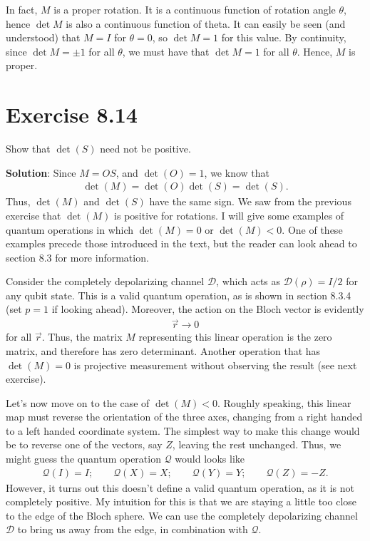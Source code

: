 \documentclass{book}
\begin{document}
    In fact, $M$ is a proper rotation. It is a continuous function of rotation angle $\theta$, hence $\det M$ is also a continuous function of theta. It can easily be seen (and understood) that $M = I$ for $\theta = 0$, so $\det M = 1$ for this value. By continuity, since $\det M = \pm 1$ for all $\theta$, we must have that $\det M = 1$ for all $\theta$. Hence, $M$ is proper. 
    
\section*{Exercise 8.14}
    Show that $\det(S)$ need not be positive.

    \textbf{Solution}: Since $M = O S$, and $\det(O) = 1$, we know that
    \begin{align}
        \det(M) = \det(O) \det(S) = \det(S).
    \end{align}
    Thus, $\det(M)$ and $\det(S)$ have the same sign. We saw from the previous exercise that $\det(M)$ is positive for rotations. I will give some examples of quantum operations in which $\det(M) = 0$ or $\det(M) < 0$. One of these examples precede those introduced in the text, but the reader can look ahead to section 8.3 for more information. 

    Consider the completely depolarizing channel $\mathcal{D}$, which acts as $\mathcal{D}(\rho) = I/2$ for any qubit state. This is a valid quantum operation, as is shown in section 8.3.4 (set $p = 1$ if looking ahead). Moreover, the action on the Bloch vector is evidently
    \begin{align}
        \vec{r} \rightarrow 0
    \end{align}
    for all $\vec{r}$. Thus, the matrix $M$ representing this linear operation is the zero matrix, and therefore has zero determinant. Another operation that has $\det(M) = 0$ is projective measurement without observing the result (see next exercise). 

    Let's now move on to the case of $\det(M) < 0$. Roughly speaking, this linear map must reverse the orientation of the three axes, changing from a right handed to a left handed coordinate system. The simplest way to make this change would be to reverse one of the vectors, say $Z$, leaving the rest unchanged. Thus, we might guess the quantum operation $\mathcal{Q}$ would looks like 
    \begin{align}
        \mathcal{Q}(I) = I; \qquad \mathcal{Q}(X) = X; \qquad \mathcal{Q}(Y) = Y; \qquad \mathcal{Q}(Z) = -Z.
    \end{align}
    However, it turns out this doesn't define a valid quantum operation, as it is not completely positive. My intuition for this is that we are staying a little too close to the edge of the Bloch sphere. We can use the completely depolarizing channel $\mathcal{D}$ to bring us away from the edge, in combination with $\mathcal{Q}$.
\end{document}
